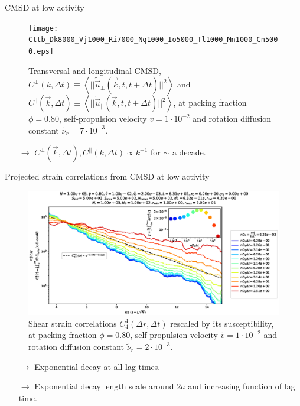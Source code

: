 \documentclass{beamer}
\begin{document}
\begin{frame}{CMSD at low activity}

\vspace{-0.2cm}
\begin{figure}[h!]
  \centering
  \texttt{[image: Cttb\_Dk8000\_Vj1000\_Ri7000\_Nq1000\_Io5000\_Tl1000\_Mn1000\_Cn5000.eps]}
  \vspace{-0.8cm}
  \caption{Transversal and longitudinal CMSD, $C^{\perp}(k, \Delta t) \equiv \left<||\tilde{\vec{u}}_{\perp}(\vec{k}, t, t  +\Delta t) ||^2\right>$ and $C^{||}(\vec{k}, \Delta t) \equiv \left<||\tilde{\vec{u}}_{||}(\vec{k}, t, t + \Delta t) ||^2\right>$, at packing fraction $\phi=0.80$, self-propulsion velocity $\tilde{v}=1\cdot10^{-2}$ and rotation diffusion constant $\tilde{\nu}_r=7\cdot10^{-3}$.}
\end{figure}

\vspace{-0.5cm}
\begin{itemize}
  \item[$\rightarrow$] $C^{\perp}(\vec{k}, \Delta t), C^{||}(k, \Delta t) \propto k^{-1}$ for $\sim$ a decade.
\end{itemize}

\end{frame}

\begin{frame}{Projected strain correlations from CMSD at low activity}

\begin{figure}[h!]
  \centering
  \includegraphics[width=0.95\linewidth]{figures/figs/c44_chi_cmsd_comparison_Dk8000_Vj1000_Ri2000_Nq1000_Ll0000_Mo1000_RCUTk4200_interpolated_linlog.eps}
  \vspace{-1.1cm}
  \caption{Shear strain correlations $C_4^4(\Delta r, \Delta t)$ rescaled by its susceptibility, at packing fraction $\phi=0.80$, self-propulsion velocity $\tilde{v}=1\cdot10^{-2}$ and rotation diffusion constant $\tilde{\nu}_r=2\cdot10^{-3}$.}
\end{figure}

\vspace{-0.8cm}
\begin{itemize}
  \item[$\rightarrow$] Exponential decay at all lag times.
  \item[$\rightarrow$] Exponential decay length scale around $2a$ and increasing function of lag time.
\end{itemize}

\end{frame}
\end{document}
